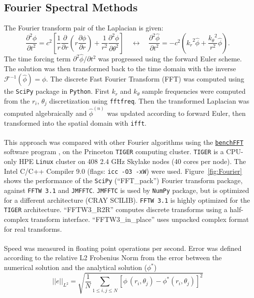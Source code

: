 \documentclass{homework}
\begin{document}
\subsection{Fourier Spectral Methods}
 The Fourier transform pair of the Laplacian is given:
$$ \frac{{\partial^2 \phi}}{{\partial t^2}} = c^2 \left[ \frac{1}{r} \frac{\partial}{\partial r} \left(r \frac{\partial \phi}{\partial r}\right) + \frac{1}{r^2} \frac{\partial^2 \phi}{\partial \theta^2} \right] \quad \longleftrightarrow \quad \frac{{\partial^2 \hat{\phi}}}{{\partial t^2}} = -c^2 \left( {k_r}^2 \hat{\phi} + \frac{{k_{\theta}}^2}{r^2} \hat{\phi} \right) .$$
\noindent
The time forcing term $\partial^2 \hat{\phi} / \partial t^2$ was progressed using the forward Euler scheme. The solution was then transformed back to the time domain with the inverse $\mathcal{F}^{-1}(\hat{\phi}) = \phi$. The discrete Fast Fourier Transform (FFT) was computed using the \texttt{SciPy} package in \texttt{Python}. First $k_r$ and $k_\theta$ sample frequencies were computed from the $r_i$, $\theta_j$ discretization using \texttt{fftfreq}. Then the transformed Laplacian was computed algebraically and $\hat{\phi}^{(n)}$ was updated according to forward Euler, then transformed into the spatial domain with \texttt{ifft}.
\\ \\ \noindent
This approach was compared with other Fourier algorithms using the \href{https://www.fftw.org/benchfft/}{\texttt{benchFFT}} software program \cite{FFTW05}, on the Princeton \texttt{TIGER} computing cluster. \texttt{TIGER} is a CPU-only HPE \texttt{Linux} cluster on 408 2.4 GHz Skylake nodes (40 cores per node). The Intel C/C++ Compiler 9.0 (flags: \texttt{icc -O3 -xW}) were used. Figure~\ref{fig:Fourier} shows the performance of the \texttt{SciPy} (``FFT\_pack'') Fourier transform package, against \texttt{FFTW 3.1} and \texttt{JMFFTC}. \texttt{JMFFTC} is used by \texttt{NumPy} package, but is optimized for a different architecture (CRAY SCILIB). \texttt{FFTW 3.1} is highly optimized for the \texttt{TIGER} architecture. ``FFTW3\_R2R'' computes discrete transforms using a half-complex transform interface. ``FFTW3\_in\_place'' uses unpacked complex format for real transforms.
\\ \\ \noindent
Speed was measured in floating point operations per second. Error was defined according to the relative L2 Frobenius Norm from the error between the numerical solution and the analytical solution ($\phi^*$)
$$||e||_{L^2} = \sqrt{\frac{1}{N} \sum_{1 \leq i,j \leq N} [\phi \, (r_i, \theta_j) - \phi^*(r_i, \theta_j)]^2}$$
\end{document}

